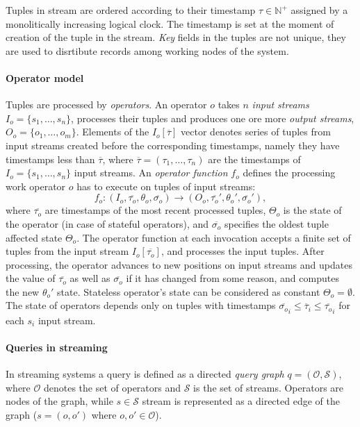  Tuples in stream are ordered according to their timestamp $\tau\in\mathbb{N}^{+}$ assigned by a monolitically increasing logical clock. The timestamp is set at the moment of creation of the tuple in the stream. \textit{Key} fields in the tuples are not unique, they are used to disrtibute records among working nodes of the system.\cite{pietzuch:intscaleoutandft}

\paragraph{Operator model}
Tuples are processed by \textit{operators}. An operator $o$ takes $n$ \textit{input streams} $I_o=\{s_1,\dots,s_n \}$, processes their tuples and produces one ore more \textit{output streams}, $O_o=\{o_1, \dots, o_m\}$. Elements of the $I_o[\overline{\tau}]$ vector denotes series of tuples from input streams created before  the corresponding timestamps, namely they have timestamps less than $\overline{\tau}$, where $\overline{\tau}=(\tau_1,\dots,\tau_n)$  are the timestamps of  $I_o=\{s_1,\dots,s_n \}$ input streams.				
An \textit{operator function} $f_o$ defines the processing work operator $o$ has to execute on tuples of input streams:
\begin{equation}
f_o : (I_o, \overline{\tau_o},\theta_o,\overline{\sigma_o})\to (O_o, \overline{\tau_o}',\theta_o',\overline{\sigma_o}'),
\end{equation}
where $\overline{\tau_o}$  are timestamps of the most recent processed tuples, $\Theta_o$ is the state of the operator (in case of stateful operators), and $\overline{\sigma_o}$ specifies the oldest tuple affected state $\Theta_o$.
The operator function at each invocation accepts a finite set of tuples from the input stream $I_o[\overline{\tau_o}]$, and processes the input tuples. After processing, the operator advances to new positions on input streams and updates the value of $\overline{\tau_o}$ as well as  $\overline{\sigma_o}$ if it has changed from some reason, and computes the new $\theta_o'$ state. Stateless operator's state can be considered as constant $\Theta_o=\emptyset$.
The state of operators depends only on tuples with timestamps $\overline{\sigma_o}_i  \leq \overline{\tau}_i \leq \overline{\tau_o}_i$ for each $s_i$ input stream. \cite{pietzuch:intscaleoutandft}
\paragraph{Queries in streaming}
In streaming systems a query is defined as a directed \textit{query graph} $ q= (\mathcal{O},\mathcal{S})$, where $\mathcal{O}$ denotes the set of operators and $\mathcal{S}$ is the set of streams. Operators are nodes of the graph, while $s \in \mathcal{S}$ stream is represented as a directed edge of the graph ($s=(o,o')$ where ${o,o'}\in \mathcal{O}$). 


